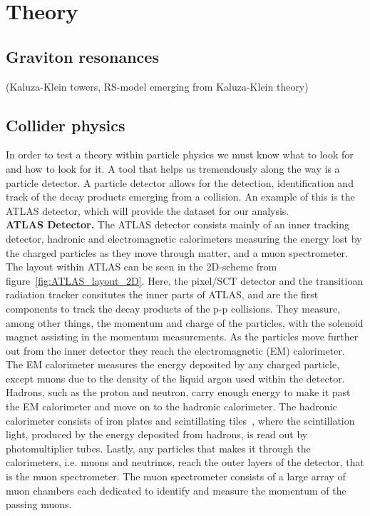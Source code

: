 \documentclass[12pt,a4paper]{amsart}
\begin{document}
\section{Theory}
\subsection{Graviton resonances}
(Kaluza-Klein towers, RS-model emerging from Kaluza-Klein theory)
\subsection{Collider physics}
In order to test a theory within particle physics we must know what to look for and how to look for it. A tool that helps us tremendously along the way is a particle detector. A particle detector allows for the detection, identification and track of the decay products emerging from a collision. An example of this is the ATLAS detector, which will provide the dataset for our analysis. \\

\textbf{ATLAS Detector.} The ATLAS detector consists mainly of an inner tracking detector, hadronic and electromagnetic calorimeters measuring the energy lost by the charged particles as they move through matter, and a muon spectrometer. The layout within ATLAS can be seen in the 2D-scheme from figure~\ref{fig:ATLAS_layout_2D}. Here, the pixel/SCT detector and the transitioan radiation tracker consitutes the inner parts of ATLAS, and are the first components to track the decay products of the p-p collisions. They measure, among other things, the momentum and charge of the particles, with the solenoid magnet assisting in the momentum measurements. As the particles move further out from the inner detector they reach the electromagnetic (EM) calorimeter. The EM calorimeter measures the energy deposited by any charged particle, except muons due to the density of the liquid argon used within the detector. Hadrons, such as the proton and neutron, carry enough energy to make it past the EM calorimeter and move on to the hadronic calorimeter. The hadronic calorimeter consists of iron plates and scintillating tiles~\cite{hadronic_calorimetry}, where the scintillation light, produced by the energy deposited from hadrons, is read out by photomultiplier tubes. Lastly, any particles that makes it through the calorimeters, i.e. muons and neutrinos, reach the outer layers of the detector, that is the muon spectrometer. The muon spectrometer consists of a large array of muon chambers each dedicated to identify and measure the momentum of the passing muons. \\
\end{document}
